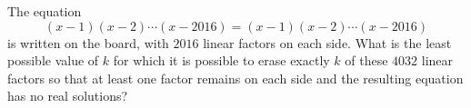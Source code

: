 The equation$$(x-1)(x-2)\cdots(x-2016)=(x-1)(x-2)\cdots (x-2016)$$is written on the board, with $2016$ linear factors on each side. What is the least possible value of $k$ for which it is possible to erase exactly $k$ of these $4032$ linear factors so that at least one factor remains on each side and the resulting equation has no real solutions?